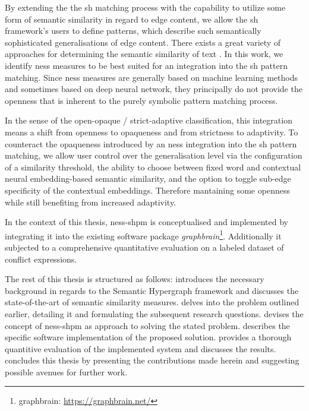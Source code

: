 \documentclass[11pt]{scrreprt}
\let\cite\parencite  %
\begin{document}
By extending the the \gls{sh} matching process with the capability to utilize some form of semantic similarity in regard to edge content, we allow the \gls{sh} framework's users to define patterns, which describe such semantically sophisticated generalisations of edge content.
There exists a great variety of approaches for determining the semantic similarity of text \cite{harispeSemanticSimilarityNatural2015, chandrasekaranEvolutionSemanticSimilarity2021}. In this work, we identify \gls{ness} measures to be best suited for an integration into the \gls{sh} pattern matching. Since \gls{ness} measures are generally based on machine learning methods and sometimes based on deep neural network, they principally do not provide the openness that is inherent to the purely symbolic pattern matching process.

 In the sense of the open-opaque / strict-adaptive classification, this integration means a shift from openness to opaqueness and from strictness to adaptivity. To counteract the opaqueness introduced by an \gls{ness} integration into the \gls{sh} pattern matching, we allow user control over the generalisation level via the configuration of a similarity threshold, the ability to choose between fixed word and contextual neural embedding-based semantic similarity, and the option to toggle sub-edge specificity of the contextual embeddings. Therefore mantaining some openness while still benefiting from increased adaptivity.

In the context of this thesis, \gls{ness-shpm} is conceptualised and implemented by integrating it into the existing software package \textit{graphbrain}\footnote{graphbrain: \url{https://graphbrain.net/}}. Additionally it subjected to a comprehensive quantitative evaluation on a labeled dataset of conflict expressions.

The rest of this thesis is structured as follows:  introduces the necessary background in regards to the Semantic Hypergraph framework and discusses the state-of-the-art of semantic similarity measures.  delves into the problem outlined earlier, detailing it and formulating the subsequent research questions.  devises the concept of \gls{ness-shpm} as approach to solving the stated problem.  describes the specific software implementation of the proposed solution.  provides a thorough quantitive evaluation of the implemented system and discusses the results. 
 concludes this thesis by presenting the contributions made herein and suggesting possible avenues for further work.
\end{document}
